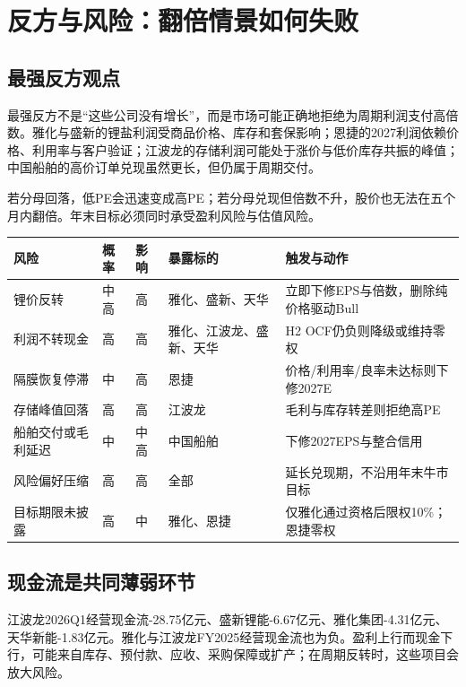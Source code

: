 \chapter{反方与风险：翻倍情景如何失败}

\section{最强反方观点}

最强反方不是“这些公司没有增长”，而是市场可能正确地拒绝为周期利润支付高倍数。雅化与盛新的锂盐利润受商品价格、库存和套保影响；恩捷的2027利润依赖价格、利用率与客户验证；江波龙的存储利润可能处于涨价与低价库存共振的峰值；中国船舶的高价订单兑现虽然更长，但仍属于周期交付。

若分母回落，低PE会迅速变成高PE；若分母兑现但倍数不升，股价也无法在五个月内翻倍。年末目标必须同时承受盈利风险与估值风险。

\begin{exhibitbox}
\small
\begin{tabularx}{\exhibitboxwidth}{L{3cm} C{1.4cm} C{1.4cm} L{2.8cm} X}
\toprule
风险 & 概率 & 影响 & 暴露标的 & 触发与动作 \\
\midrule
锂价反转 & 中高 & 高 & 雅化、盛新、天华 & 立即下修EPS与倍数，删除纯价格驱动Bull \\
利润不转现金 & 高 & 高 & 雅化、江波龙、盛新、天华 & H2 OCF仍负则降级或维持零权 \\
隔膜恢复停滞 & 中 & 高 & 恩捷 & 价格/利用率/良率未达标则下修2027E \\
存储峰值回落 & 高 & 高 & 江波龙 & 毛利与库存转差则拒绝高PE \\
船舶交付或毛利延迟 & 中 & 中高 & 中国船舶 & 下修2027EPS与整合信用 \\
风险偏好压缩 & 高 & 高 & 全部 & 延长兑现期，不沿用年末牛市目标 \\
目标期限未披露 & 高 & 中 & 雅化、恩捷 & 仅雅化通过资格后限权10\%；恩捷零权 \\
\bottomrule
\end{tabularx}
\end{exhibitbox}

\section{现金流是共同薄弱环节}

江波龙2026Q1经营现金流-28.75亿元、盛新锂能-6.67亿元、雅化集团-4.31亿元、天华新能-1.83亿元。雅化与江波龙FY2025经营现金流也为负。盈利上行而现金下行，可能来自库存、预付款、应收、采购保障或扩产；在周期反转时，这些项目会放大风险。

